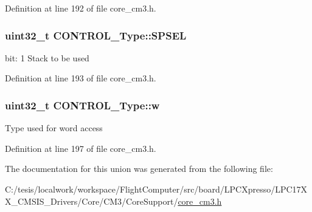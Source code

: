 \-Definition at line 192 of file core\-\_\-cm3.\-h.

\hypertarget{union_c_o_n_t_r_o_l___type_a8cc085fea1c50a8bd9adea63931ee8e2}{
\subsubsection[{\-S\-P\-S\-E\-L}]{\setlength{\rightskip}{0pt plus 5cm}uint32\-\_\-t {\bf \-C\-O\-N\-T\-R\-O\-L\-\_\-\-Type\-::\-S\-P\-S\-E\-L}}}\label{union_c_o_n_t_r_o_l___type_a8cc085fea1c50a8bd9adea63931ee8e2}
bit\-: 1 \-Stack to be used 

\-Definition at line 193 of file core\-\_\-cm3.\-h.

\hypertarget{union_c_o_n_t_r_o_l___type_a6b642cca3d96da660b1198c133ca2a1f}{
\subsubsection[{w}]{\setlength{\rightskip}{0pt plus 5cm}uint32\-\_\-t {\bf \-C\-O\-N\-T\-R\-O\-L\-\_\-\-Type\-::w}}}\label{union_c_o_n_t_r_o_l___type_a6b642cca3d96da660b1198c133ca2a1f}
\-Type used for word access 

\-Definition at line 197 of file core\-\_\-cm3.\-h.



\-The documentation for this union was generated from the following file\-:\begin{DoxyCompactItemize}
\item 
\-C\-:/tesis/localwork/workspace/\-Flight\-Computer/src/board/\-L\-P\-C\-Xpresso/\-L\-P\-C17\-X\-X\-\_\-\-C\-M\-S\-I\-S\-\_\-\-Drivers/\-Core/\-C\-M3/\-Core\-Support/\hyperlink{core__cm3_8h}{core\-\_\-cm3.\-h}\end{DoxyCompactItemize}
